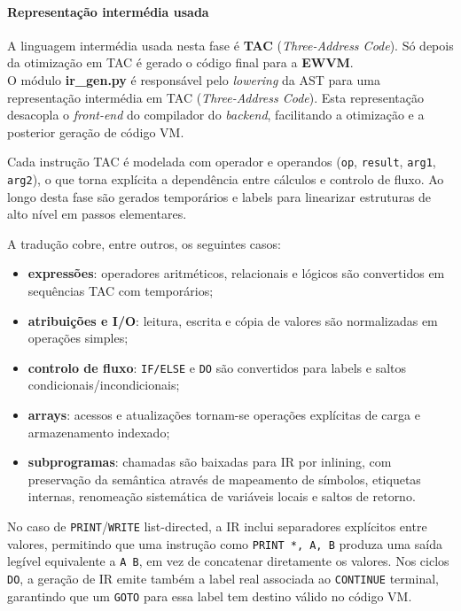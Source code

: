 \documentclass{article}
\begin{document}
\paragraph{Representação intermédia usada}
A linguagem intermédia usada nesta fase é \textbf{TAC} (\textit{Three-Address Code}).
Só depois da otimização em TAC é gerado o código final para a \textbf{EWVM}.
\\

O módulo \textbf{ir\_gen.py} é responsável pelo \textit{lowering} da AST para uma
representação intermédia em TAC (\textit{Three-Address Code}). Esta representação desacopla
o \textit{front-end} do compilador do \textit{backend}, facilitando a otimização e a
posterior geração de código VM.

Cada instrução TAC é modelada com operador e operandos (\texttt{op}, \texttt{result},
\texttt{arg1}, \texttt{arg2}), o que torna explícita a dependência entre cálculos e
controlo de fluxo. Ao longo desta fase são gerados temporários e labels para linearizar
estruturas de alto nível em passos elementares.

A tradução cobre, entre outros, os seguintes casos:

\begin{itemize}
\item \textbf{expressões}: operadores aritméticos, relacionais e lógicos são convertidos em
sequências TAC com temporários;
\item \textbf{atribuições e I/O}: leitura, escrita e cópia de valores são normalizadas em
operações simples;
\item \textbf{controlo de fluxo}: \texttt{IF/ELSE} e \texttt{DO} são convertidos para labels e
saltos condicionais/incondicionais;
\item \textbf{arrays}: acessos e atualizações tornam-se operações explícitas de carga e
armazenamento indexado;
\item \textbf{subprogramas}: chamadas são baixadas para IR por inlining, com preservação da
semântica através de mapeamento de símbolos, etiquetas internas, renomeação sistemática de
variáveis locais e saltos de retorno.
\end{itemize}

No caso de \texttt{PRINT}/\texttt{WRITE} list-directed, a IR inclui separadores explícitos
entre valores, permitindo que uma instrução como \texttt{PRINT *, A, B} produza uma saída
legível equivalente a \texttt{A B}, em vez de concatenar diretamente os valores. Nos ciclos
\texttt{DO}, a geração de IR emite também a label real associada ao \texttt{CONTINUE}
terminal, garantindo que um \texttt{GOTO} para essa label tem destino válido no código VM.
\end{document}
